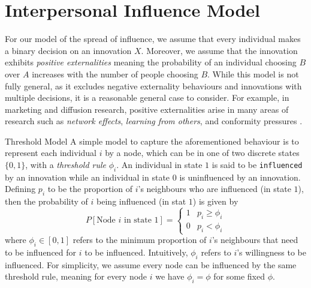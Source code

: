 \documentclass[10pt, oneside, reqno]{amsart}
\makeatletter
\theoremstyle{plain}%
\theoremstyle{definition}
\theoremstyle{remark}
\renewcommand\subsection{\@startsection{subsection}{2}%
  \z@{.5\linespacing\@plus.7\linespacing}{-.5em}%
  {\normalfont\scshape}}
\makeatother
\begin{document}




\section{Interpersonal Influence Model}

For our model of the spread of influence, we assume that every individual makes a binary decision
on an innovation $X$. Moreover, we assume that the innovation exhibits \textit{positive externalities}
meaning the probability of an individual choosing $B$ over $A$ increases with the number of 
people choosing $B$. While this model is not fully general, as it excludes negative externality 
behaviours and innovations with multiple decisions, it is a reasonable general case to consider. 
For example, in marketing and diffusion research, positive externalities arise in many areas of 
research such as \textit{network effects}, \textit{learning from others}, and conformity 
pressures \cite{Influential}.

\subsection{Threshold Model}
A simple model to capture the aforementioned behaviour is to represent each individual $i$ by a node,
which can be in one of two discrete states $\{ 0, 1\}$, with a \textit{threshold rule} $\phi_i$. 
An individual in state $1$ is said to be \texttt{influenced} by an innovation while an 
individual in state $0$ is uninfluenced by an innovation.
Defining $p_i$ to be the proportion of $i$'s neighbours who are influenced (in state $1$), then 
the probability of $i$ being influenced (in stat $1$) is given by
\[ P[\text{Node } i \text{ in state } 1] = 
\begin{cases}
    1 & p_i \geq \phi_i \\
    0 & p_i < \phi_i
\end{cases} \]
where $\phi_i \in [0,1]$ refers to the minimum proportion of $i$'s neighbours that need to be 
influenced for $i$ to be influenced. Intuitively, $\phi_i$ refers to $i$'s willingness to be 
influenced.
For simplicity, we assume every node can be influenced by the same threshold rule, meaning 
for every node $i$ we have $\phi_i = \phi$ for some fixed $\phi$.
\end{document}
